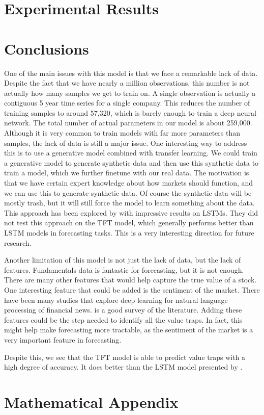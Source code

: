 \documentclass[AER]{AEA}
\begin{document}
\section{Experimental Results}
\section{Conclusions}
One of the main issues with this model is that we face a remarkable lack of data.
Despite the fact that we have nearly a million observations, this number is not actually how many samples we get to train on.
A single observation is actually a contiguous 5 year time series for a single company. 
This reduces the number of training samples to around 57,320, which is barely enough to train a deep neural network.
The total number of actual parameters in our model is about 259,000. 
Although it is very common to train models with far more parameters than samples, the lack of data is still a major issue.
One interesting way to address this is to use a generative model combined with transfer learning.
We could train a generative model to generate synthetic data and then use this synthetic data to train a model, which we further finetune with our real data.
The motivation is that we have certain expert knowledge about how markets should function, and we can use this to generate synthetic data.
Of course the synthetic data will be mostly trash, but it will still force the model to learn something about the data.
This approach has been explored by \cite{dataAug} with impressive results on LSTMs. 
They did not test this approach on the TFT model, which generally performs better than LSTM models in forecasting tasks.
This is a very interesting direction for future research.

Another limitation of this model is not just the lack of data, but the lack of features. 
Fundamentals data is fantastic for forecasting, but it is not enough. 
There are many other features that would help capture the true value of a stock.
One interesting feature that could be added is the sentiment of the market. 
There have been many studies that explore deep learning for natural language processing of financial news.
\cite{sentimentAnalysis} is a good survey of the literature.
Adding these features could be the step needed to identify all the value traps. 
In fact, this might help make forecasting more tractable, as the sentiment of the market is a very important feature in forecasting.

Despite this, we see that the TFT model is able to predict value traps with a high degree of accuracy. 
It does better than the LSTM model presented by \cite{euclidean}. 



\appendix

\section{Mathematical Appendix}
\end{document}
